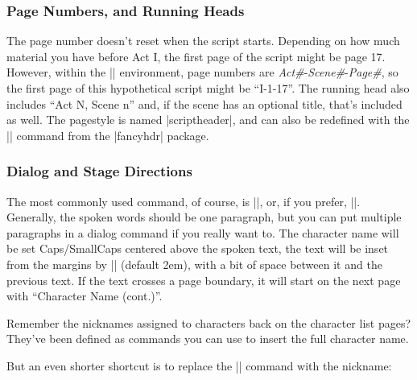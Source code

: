 \documentclass{article}
\let\ital\textit
\begin{document}
\subsubsection{Page Numbers, and Running Heads}

The page number doesn’t reset when the script starts. Depending on how much material you have before Act I, the first page of the script might be page 17. However, within the |\script| environment, page numbers are \ital{Act\#}-\ital{Scene\#}-\ital{Page\#}, so the first page of this hypothetical script might be “I-1-17”. The running head also includes “Act N, Scene n” and, if the scene has an optional title, that’s included as well. The pagestyle is named |scriptheader|, and can also be redefined with the |\fancypagestyle| command from the |fancyhdr| package. 

\subsubsection{Dialog and Stage Directions}

The most commonly used command, of course, is ||, or, if you prefer, |\dialogue|. Generally, the spoken words should be one paragraph, but you can put multiple paragraphs in a dialog command if you really want to. The character name will be set Caps/SmallCaps centered above the spoken text, the text will be inset from the margins by |\speechmargin| (default 2em), with a bit of space between it and the previous text. If the text crosses a page boundary, it will start on the next page with “Character Name (cont.)”. 

\begin{example}
\end{example}

Remember the nicknames assigned to characters back on the character list pages? They’ve been defined as commands you can use to insert the full character name. 
\begin{example}
\end{example}

But an even shorter shortcut is to replace the |\dialog| command with the nickname:
\begin{example}
\end{example}
\end{document}

